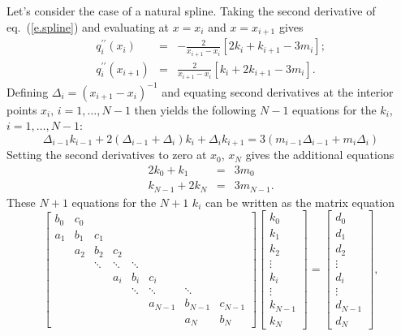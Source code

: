 Let's consider the case of a natural spline. Taking the second derivative of eq.~(\ref{e.spline}) and evaluating at $x=x_{i}$ and $x=x_{i+1}$ gives
\begin{eqnarray}
\label{e.d2spline-left}
q^{\prime\prime}_{i}(x_{i}) &=& -\frac{2}{x_{i+1}-x_{i}}\left[ 2k_{i} + k_{i+1} - 3m_{i} \right];\\
\label{e.d2spline-right}
q^{\prime\prime}_{i}(x_{i+1}) &=& \frac{2}{x_{i+1}-x_{i}}\left[ k_{i} + 2k_{i+1} - 3m_{i} \right].
\end{eqnarray}
Defining $\Delta_{i} = (x_{i+1}-x_{i})^{-1}$ and equating second derivatives at the interior points $x_{i},\,i=1,\ldots,N-1$ then yields the following $N-1$ equations for the $k_{i}$, $i=1,\ldots,N-1$:
\begin{equation}
\Delta_{i-1}k_{i-1} + 2\left(\Delta_{i-1} + \Delta_{i}\right) k_{i} + \Delta_{i}k_{i+1} = 3\left(m_{i-1}\Delta_{i-1} + m_{i}\Delta_{i}\right)
\end{equation}
Setting the second derivatives to zero at $x_{0}$, $x_{N}$ gives the additional equations
\begin{eqnarray}
2k_{0} + k_{1} &=& 3m_{0}\\
k_{N-1} + 2k_{N} &=& 3m_{N-1}.
\end{eqnarray}
These $N+1$ equations for the $N+1$ $k_{i}$ can be written as the matrix equation
\[
\left[\begin{array}{ccccccccccc}
	b_{0} & c_{0} \\
	a_{1} & b_{1} & c_{1} \\
	& a_{2} & b_{2} & c_{2}\\
	& & \ddots & \ddots & \ddots \\
	& & & a_{i} & b_{i} & c_{i} \\
	& & & & \ddots & \ddots & \ddots \\
	& & & & & a_{N-1} & b_{N-1} & c_{N-1} \\
	& & & & & & a_{N} & b_{N} 
\end{array}\right]
\left[\begin{array}{c}
	k_{0}\\
	k_{1}\\
	k_{2}\\
	\vdots\\
	k_{i}\\
	\vdots\\
	k_{N-1}\\
	k_{N}
\end{array}\right] = 
\left[\begin{array}{c}
	d_{0}\\
	d_{1}\\
	d_{2}\\
	\vdots\\
	d_{i}\\
	\vdots\\
	d_{N-1}\\
	d_{N}
\end{array}\right],
\]
